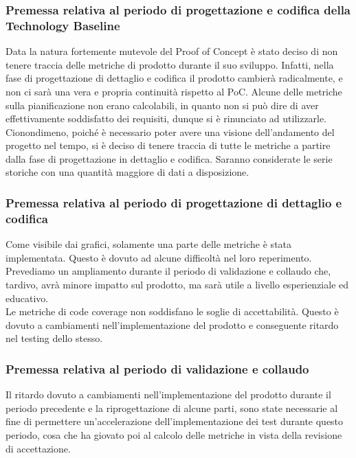 \subsubsection{Premessa relativa al periodo di progettazione e codifica della Technology Baseline}
Data la natura fortemente mutevole del Proof of Concept è stato deciso di non tenere traccia delle metriche di prodotto durante il suo sviluppo. Infatti, nella fase di progettazione di dettaglio e codifica il prodotto cambierà radicalmente, e non ci sarà una vera e propria continuità rispetto al PoC. \newline
Alcune delle metriche sulla pianificazione non erano calcolabili, in quanto non si può dire di aver effettivamente soddisfatto dei requisiti, dunque si è rinunciato ad utilizzarle.
Cionondimeno, poiché è necessario poter avere una visione dell'andamento del progetto nel tempo, si è deciso di tenere traccia di tutte le metriche a partire dalla fase di progettazione in dettaglio e codifica. Saranno considerate le serie storiche con una quantità maggiore di dati a disposizione.
\subsubsection{Premessa relativa al periodo di progettazione di dettaglio e codifica}
Come visibile dai grafici, solamente una parte delle metriche è stata implementata. Questo è dovuto ad alcune difficoltà nel loro reperimento.
Prevediamo un ampliamento durante il periodo di validazione e collaudo che, tardivo, avrà minore impatto sul prodotto, ma sarà utile a livello esperienziale ed educativo.\\
Le metriche di code coverage non soddisfano le soglie di accettabilità. Questo è dovuto a cambiamenti nell'implementazione del prodotto e conseguente ritardo nel testing dello stesso.
\subsubsection{Premessa relativa al periodo di validazione e collaudo}
Il ritardo dovuto a cambiamenti nell'implementazione del prodotto durante il periodo precedente e la riprogettazione di alcune parti, sono state necessarie al fine di permettere un'accelerazione dell'implementazione dei test durante questo periodo, cosa che ha giovato poi al calcolo delle metriche in vista della revisione di accettazione.
